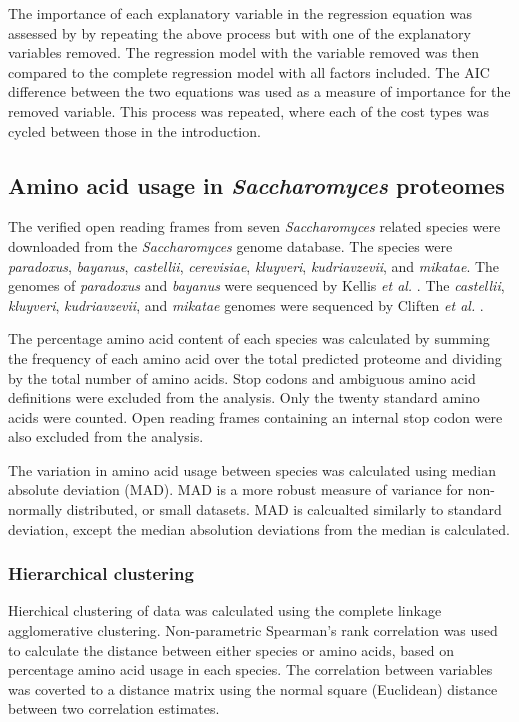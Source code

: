 The importance of each explanatory variable in the regression equation was assessed by by repeating the above process but with one of the explanatory variables removed. The regression model with the variable removed was then compared to the complete regression model with all factors included. The AIC difference between the two equations was used as a measure of importance for the removed variable. This process was repeated, where each of the cost types was cycled between those in the introduction.

\subsection{Amino acid usage in \emph{Saccharomyces} proteomes}

The verified open reading frames from seven \emph{Saccharomyces} related species were downloaded from the \emph{Saccharomyces} genome database. The species were \emph{paradoxus}, \emph{bayanus}, \emph{castellii}, \emph{cerevisiae}, \emph{kluyveri}, \emph{kudriavzevii}, and \emph{mikatae}. The genomes of \emph{paradoxus} and \emph{bayanus} were sequenced by Kellis \emph{et al.} \cite{kellis2003}. The \emph{castellii}, \emph{kluyveri}, \emph{kudriavzevii}, and \emph{mikatae} genomes were sequenced by Cliften \emph{et al.} \cite{cliften2003}.

The percentage amino acid content of each species was calculated by summing the frequency of each amino acid over the total predicted proteome and dividing by the total number of amino acids. Stop codons and ambiguous amino acid definitions were excluded from the analysis. Only the twenty standard amino acids were counted. Open reading frames containing an internal stop codon were also excluded from the analysis.

The variation in amino acid usage between species was calculated using median absolute deviation (MAD). MAD is a more robust measure of variance for non-normally distributed, or small datasets. MAD is calcualted similarly to standard deviation, except the median absolution deviations from the median is calculated.

\subsubsection{Hierarchical clustering}

Hierchical clustering of data was calculated using the complete linkage agglomerative clustering. Non-parametric Spearman's rank correlation was used to calculate the distance between either species or amino acids, based on percentage amino acid usage in each species. The correlation between variables was coverted to a distance matrix using the normal square (Euclidean) distance between two correlation estimates.

